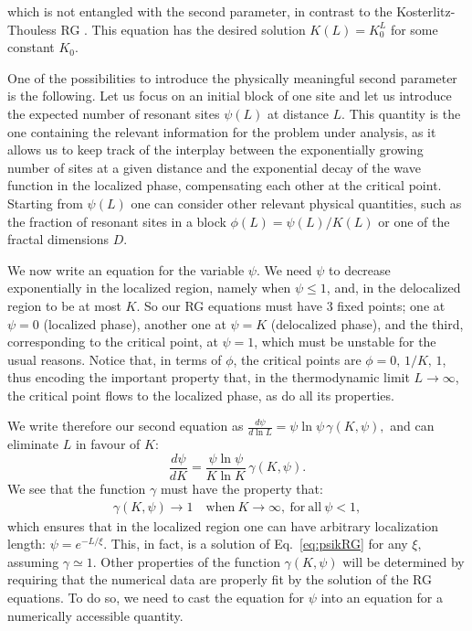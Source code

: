 \documentclass[reprint,aps,prl,superscriptaddress,english,nolongbibliography]{revtex4-2}
\begin{document}
{which is not entangled with the second parameter, in contrast to the Kosterlitz-Thouless RG \cite{1971JETP...32..493B,1972JETP...34..610B,1973JPhC....6.1181K}.
This equation has the desired solution $K(L)=K_0^L$ for some constant $K_0$.

One of the possibilities to introduce the physically meaningful second parameter is the following. Let us focus on an initial block of one site and let us introduce the expected number of resonant sites $\psi(L)$ at distance $L$. This quantity is the one containing the relevant information for the problem under analysis, as it allows us to keep track of the interplay between the exponentially growing number of sites at a given distance and the exponential decay of the wave function in the localized phase, compensating each other at the critical point. Starting from $\psi(L)$ one can consider other relevant physical quantities, such as the fraction of resonant sites in a block $\phi(L)=\psi(L)/K(L)$ or one of the fractal dimensions $D$. 

We now write an equation for the variable $\psi$. We need $\psi$ to decrease exponentially in the localized region, namely when $\psi\leq 1$, and, in the delocalized region to be at most $K$. 
So our RG equations must have 3 fixed points; one at $\psi=0$ (localized phase), another one at $\psi=K$ (delocalized phase), and the third, corresponding to the critical point, at $\psi=1$, which must be unstable for the usual reasons. 
Notice that, in terms of $\phi$, the critical points are $\phi = 0,\, 1/K, \, 1$, thus encoding the important property that, in the thermodynamic limit $L \to \infty$, the critical point flows to the localized phase, as do all its properties.

We write therefore our second equation as $\frac{d\psi}{d\ln L}=\psi\ln \psi \, \gamma(K,\psi),$ and can eliminate $L$ in favour of $K$:
\begin{equation}
    \frac{d\psi}{dK}=\frac{\psi\ln \psi}{K\ln K} \, \gamma(K,\psi).
    \label{eq:psikRG}
\end{equation}
We see that the function $\gamma$ must have the property that:
\begin{eqnarray}
    \gamma(K,\psi)\to 1\quad \mathrm{when\ } K\to\infty,\ \mathrm{for\ all\ }\psi<1,
\end{eqnarray}
which ensures that in the localized region one can have arbitrary localization length: $\psi=e^{-L/\xi}$. This, in fact, is a solution of Eq.~\eqref{eq:psikRG} for any $\xi$, assuming $\gamma\simeq 1$. Other properties of the function $\gamma(K,\psi)$ will be determined by requiring that the numerical data are properly fit by the solution of the RG equations. To do so, we need to cast the equation for $\psi$ into an equation for a numerically accessible quantity. 

}
\end{document}
